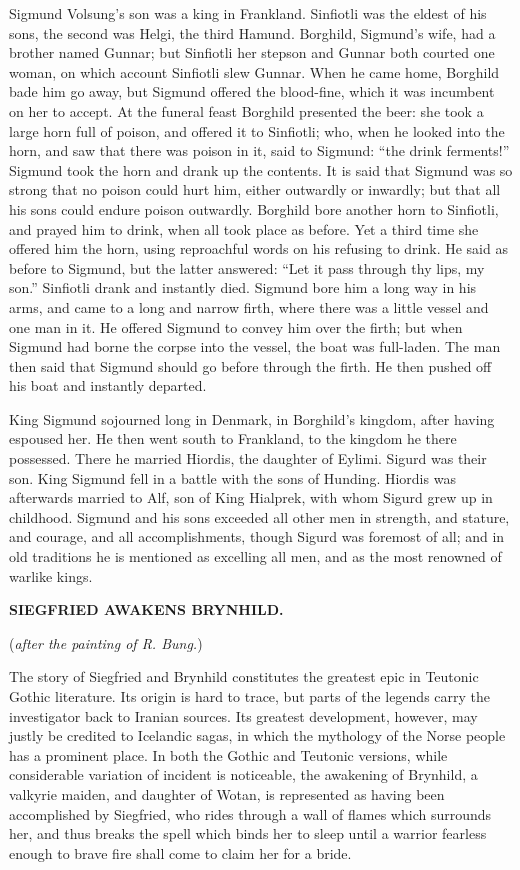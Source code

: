 Sigmund Volsung's son was a king in Frankland. Sinfiotli was the
eldest of his sons, the second was Helgi, the third Hamund. Borghild,
Sigmund's wife, had a brother named Gunnar; but Sinfiotli her stepson
and Gunnar both courted one woman, on which account Sinfiotli slew
Gunnar. When he came home, Borghild bade him go away, but Sigmund
offered the blood-fine, which it was incumbent on her to accept. At
the funeral feast Borghild presented the beer: she took a large horn
full of poison, and offered it to Sinfiotli; who, when he looked into
the horn, and saw that there was poison in it, said to Sigmund: ``the
drink ferments!'' Sigmund took the horn and drank up the contents. It
is said that Sigmund was so strong that no poison could hurt him,
either outwardly or inwardly; but that all his sons could endure
poison outwardly. Borghild bore another horn to Sinfiotli, and prayed
him to drink, when all took place as before. Yet a third time she
offered him the horn, using reproachful words on his refusing to
drink. He said as before to Sigmund, but the latter answered: ``Let it
pass through thy lips, my son.'' Sinfiotli drank and instantly died.
Sigmund bore him a long way in his arms, and came to a long and narrow
firth, where there was a little vessel and one man in it. He offered
Sigmund to convey him over the firth; but when Sigmund had borne the
corpse into the vessel, the boat was full-laden. The man then said
that Sigmund should go before through the firth. He then pushed off
his boat and instantly departed.

King Sigmund sojourned long in Denmark, in Borghild's kingdom, after
having espoused her. He then went south to Frankland, to the kingdom
he there possessed. There he married Hiordis, the daughter of Eylimi.
Sigurd was their son. King Sigmund fell in a battle with the sons of
Hunding. Hiordis was afterwards married to Alf, son of King Hialprek,
with whom Sigurd grew up in childhood. Sigmund and his sons exceeded
all other men in strength, and stature, and courage, and all
accomplishments, though Sigurd was foremost of all; and in old
traditions he is mentioned as excelling all men, and as the most
renowned of warlike kings.

\textbf{SIEGFRIED AWAKENS BRYNHILD.}

(\emph{after the painting of R. Bung.})

The story of Siegfried and Brynhild constitutes the greatest epic in
Teutonic Gothic literature. Its origin is hard to trace, but parts of
the legends carry the investigator back to Iranian sources. Its
greatest development, however, may justly be credited to Icelandic
sagas, in which the mythology of the Norse people has a prominent
place. In both the Gothic and Teutonic versions, while considerable
variation of incident is noticeable, the awakening of Brynhild, a
valkyrie maiden, and daughter of Wotan, is represented as having been
accomplished by Siegfried, who rides through a wall of flames which
surrounds her, and thus breaks the spell which binds her to sleep
until a warrior fearless enough to brave fire shall come to claim her
for a bride.

